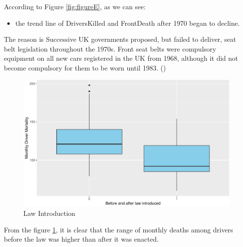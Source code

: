 \documentclass[11pt,a4paper,]{article}
\providecommand{\tightlist}{%
  \setlength{\itemsep}{0pt}\setlength{\parskip}{0pt}}
\begin{document}
According to Figure \ref{fig:figureE}, as we can see:

\begin{itemize}
\tightlist
\item
  the trend line of DriversKilled and FrontDeath after 1970 began to decline.
\end{itemize}

The reason is Successive UK governments proposed, but failed to deliver, seat belt legislation throughout the 1970s. Front seat belts were compulsory equipment on all new cars registered in the UK from 1968, although it did not become compulsory for them to be worn until 1983. (\cite{richens2000condoms}) \clearpage

\begin{figure}
\centering
\includegraphics{report_files/figure-latex/Bluebox-1.pdf}
\caption{\label{fig:Bluebox}Law Introduction}
\end{figure}

From the figure \ref{fig:Bluebox}, it is clear that the range of monthly deaths among drivers before the law was higher than after it was enacted.
\end{document}
